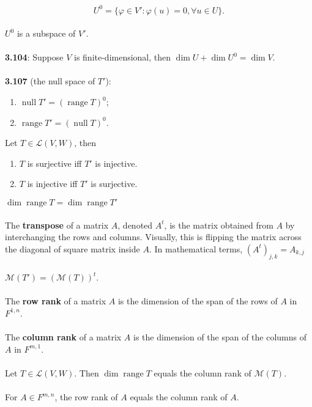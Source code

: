 \documentclass{article}
\DeclareMathOperator{\Null}{null}
\DeclareMathOperator{\Range}{range}
\DeclareMathOperator{\Dim}{dim}
\theoremstyle{definition}
\begin{document}
$$U^0 = \{\varphi \in V': \varphi(u) = 0, \forall u \in U\}.$$ \\
$U^0$ is a subspace of $V'$. \\ \\
\textbf{3.104}: Suppose $V$ is finite-dimensional, then $\Dim{U} + \Dim{U^0} = \Dim{V}$. \\ \\
\textbf{3.107} (the null space of $T'$): \begin{enumerate}
    \item $\Null{T'} = (\Range{T})^0$;
    \item $\Range{T'} = (\Null{T})^0$.
\end{enumerate} $ $ \\
Let $T \in \mathcal{L}(V, W)$, then \begin{enumerate}
\item $T$ is surjective iff $T'$ is injective.
\item $T$ is injective iff $T'$ is surjective.
\end{enumerate} $ $ \\
$\Dim{\Range{T}} = \Dim{\Range{T'}}$ \\ \\
The \textbf{transpose} of a matrix $A$, denoted $A^t$, is the matrix obtained from $A$ by interchanging the rows and columns. Visually, this is flipping the matrix across the diagonal of square matrix inside $A$. In mathematical terms, $(A^t)_{j, k} = A_{k, j}$ \\ \\
$\mathcal{M}(T') = (\mathcal{M}(T))^t$. \\ \\
The \textbf{row rank} of a matrix $A$ is the dimension of the span of the rows of $A$ in $F^{1, n}$. \\ \\
The \textbf{column rank} of a matrix $A$ is the dimension of the span of the columns of $A$ in $F^{m, 1}$. \\ \\
Let $T \in \mathcal{L}(V, W)$. Then $\Dim{\Range{T}}$ equals the column rank of $\mathcal{M}(T)$. \\ \\
For $A \in F^{m, n}$, the row rank of $A$ equals the column rank of $A$.
\end{document}
